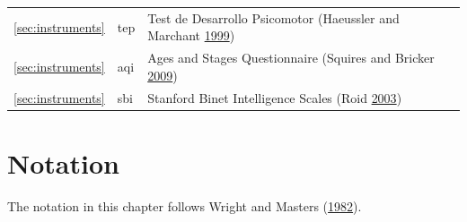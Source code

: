 \documentclass[
]{book}
\begin{document}
\begin{longtable}[]{@{}lll@{}}
\begin{minipage}[t]{0.12\columnwidth}\raggedright
\ref{sec:instruments}\strut
\end{minipage} & \begin{minipage}[t]{0.19\columnwidth}\raggedright
tep\strut
\end{minipage} & \begin{minipage}[t]{0.61\columnwidth}\raggedright
Test de Desarrollo Psicomotor (Haeussler and Marchant \protect\hyperlink{ref-haeussler1999}{1999})\strut
\end{minipage}\tabularnewline
\begin{minipage}[t]{0.12\columnwidth}\raggedright
\ref{sec:instruments}\strut
\end{minipage} & \begin{minipage}[t]{0.19\columnwidth}\raggedright
aqi\strut
\end{minipage} & \begin{minipage}[t]{0.61\columnwidth}\raggedright
Ages and Stages Questionnaire (Squires and Bricker \protect\hyperlink{ref-squires2009}{2009})\strut
\end{minipage}\tabularnewline
\begin{minipage}[t]{0.12\columnwidth}\raggedright
\ref{sec:instruments}\strut
\end{minipage} & \begin{minipage}[t]{0.19\columnwidth}\raggedright
sbi\strut
\end{minipage} & \begin{minipage}[t]{0.61\columnwidth}\raggedright
Stanford Binet Intelligence Scales (Roid \protect\hyperlink{ref-roid2003}{2003})\strut
\end{minipage}\tabularnewline
\bottomrule
\end{longtable}

\hypertarget{ap:notation}{%
\chapter{Notation}\label{ap:notation}}

The notation in this chapter follows Wright and Masters (\protect\hyperlink{ref-wright1982}{1982}).
\end{document}
